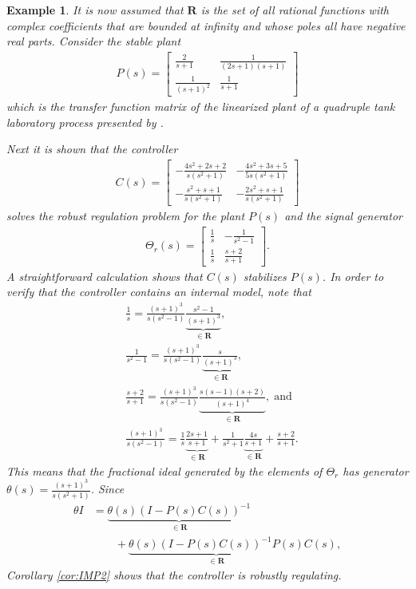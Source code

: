 \documentclass[11pt, a4paper]{amsart}
\newcommand{\inv}{^{-1}}
\newtheorem{exa}{Example}
\newcommand{\Plant}{P}										%
\newcommand{\Cont}{C}										%
\newcommand{\Gen}{\Theta}									%
\newcommand{\gen}{\theta}									%
\newcommand{\stable}{\mathbf{R}}							%
\begin{document}
\begin{exa}
It is now assumed that $\stable$ is the set of all rational functions with complex coefficients that are bounded at infinity and whose poles all have negative real parts. Consider the stable plant
\begin{align*}
\Plant(s)=\begin{bmatrix}
 \frac{2}{s+1} & \frac{1}{(2s+1)(s+1)} \\
\frac{1}{(s+1)^2} & \frac{1}{s+1}
\end{bmatrix}
\end{align*}
which is the transfer function matrix of the linearized plant of a quadruple tank laboratory process presented by \cite{Johansson2000}.

Next it is shown that the controller
\begin{align*}
\Cont(s)=\begin{bmatrix}
-\frac{4s^2 + 2s + 2}{s(s^2+1)} &  -\frac{4s^2 + 3s + 5}{5s(s^2+1)} \\
-\frac{s^2 + s + 1}{s(s^2+1)} & -\frac{2s^2 + s + 1}{s(s^2+1)}
\end{bmatrix}
\end{align*}
solves the robust regulation problem for the plant $\Plant(s)$ and the signal generator
\begin{align*}
\Gen_r(s)=\begin{bmatrix}
\frac{1}{s} & -\frac{1}{s^2-1}\\
\frac{1}{s} & \frac{s+2}{s+1}
\end{bmatrix}.	
\end{align*}
A straightforward calculation shows that $\Cont(s)$ stabilizes $\Plant(s)$. In order to verify that the controller contains an internal model, note that
\begin{align*}
& \frac{1}{s}=\frac{(s+1)^3}{s(s^2-1)}\underbrace{\frac{s^2-1}{(s+1)^3}}_{\in\stable},\\ 
& \frac{1}{s^2-1}=\frac{(s+1)^3}{s(s^2-1)}\underbrace{\frac{s}{(s+1)^3}}_{\in\stable},\\
& \frac{s+2}{s+1}=\frac{(s+1)^3}{s(s^2-1)}\underbrace{\frac{s(s-1)(s+2)}{(s+1)^4}}_{\in\stable},\; \text{and}\\
&
\frac{(s+1)^3}{s(s^2-1)}=\frac{1}{s}\underbrace{\frac{2s+1}{s+1}}_{\in\stable}+\frac{1}{s^2+1}\underbrace{\frac{4s}{s+1}}_{\in\stable}+\frac{s+2}{s+1}.
\end{align*}
This means that the fractional ideal generated by the elements of $\Gen_r$ has generator $\gen(s)=\frac{(s+1)^3}{s(s^2+1)}$. Since
\begin{align*}
\gen I & =\underbrace{\gen(s)(I-\Plant(s)\Cont(s))\inv}_{\in\stable}\\
& \qquad +\underbrace{\gen(s)(I-\Plant(s)\Cont(s))\inv\Plant(s)}_{\in\stable} \Cont(s),
\end{align*}
Corollary \ref{cor:IMP2} shows that the controller is robustly regulating.


\end{exa}
\end{document}
